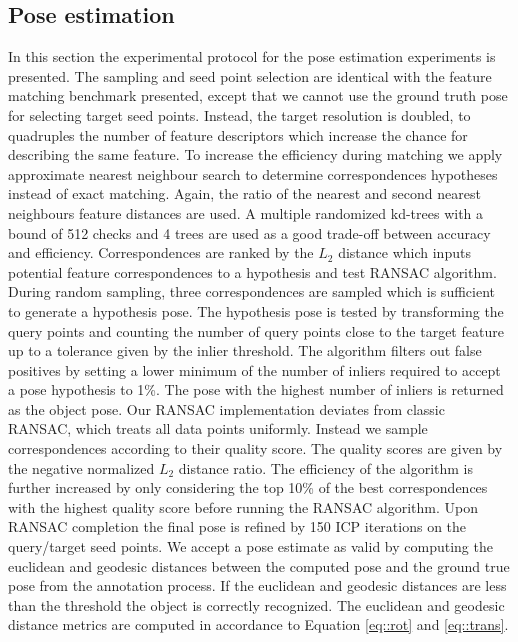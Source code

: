 \documentclass[10pt,twocolumn,letterpaper]{article}
\begin{document}
\subsection{Pose estimation}\label{sec:pose_estimation}
In this section the experimental protocol for the pose estimation experiments is presented. The sampling and seed point selection are identical with the feature matching benchmark presented, except that we cannot use the ground truth pose for selecting target seed points. Instead, the target resolution is doubled, to quadruples the number of feature descriptors which increase the chance for describing the same feature. To increase the efficiency during matching we apply approximate nearest neighbour search to determine correspondences hypotheses instead of exact matching. Again, the ratio of the nearest and second nearest neighbours feature distances are used. A multiple randomized kd-trees with a bound of 512 checks and 4 trees are used as a good trade-off between accuracy and efficiency. Correspondences are ranked by the ${L_2}$ distance which inputs potential feature correspondences to a hypothesis and test RANSAC algorithm.
During random sampling, three correspondences are sampled which is sufficient to generate a hypothesis pose. The hypothesis pose is tested by transforming the query points and counting the number of query points close to the target feature up to a tolerance given by the inlier threshold. The algorithm filters out false positives by setting a lower minimum of the number of inliers required to accept a pose hypothesis to 1\%. The pose with the highest number of inliers is returned as the object pose. Our RANSAC implementation deviates from classic RANSAC, which treats all data points uniformly. Instead we sample correspondences according to their quality score. The quality scores are given by the negative normalized ${L_2}$ distance ratio. The efficiency of the algorithm is further increased by only considering the top 10\% of the best correspondences with the highest quality score before running the RANSAC algorithm. Upon RANSAC completion the final pose is refined by 150 ICP iterations on the query/target seed points. We accept a pose estimate as valid by computing the euclidean and geodesic distances between the computed pose and the ground true pose from the annotation process. If the euclidean and geodesic distances are less than the threshold the object is correctly recognized. The euclidean and geodesic distance metrics are computed in accordance to Equation \ref{eq::rot} and \ref{eq::trans}.      
\end{document}
